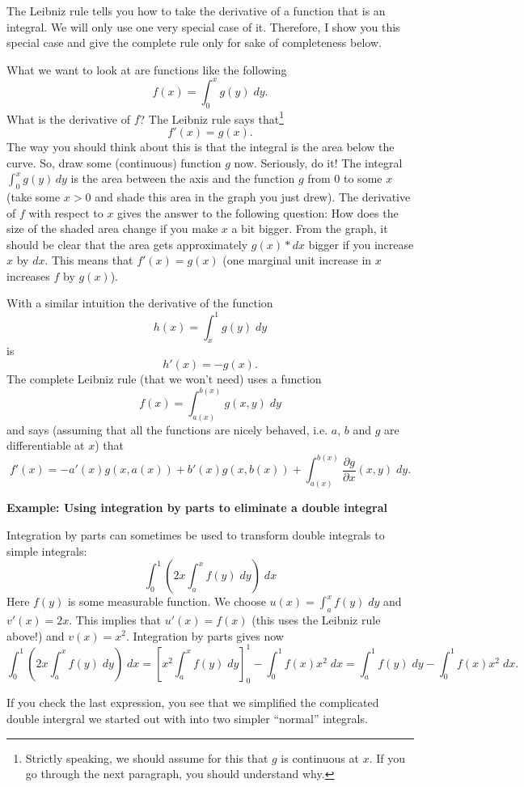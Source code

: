 \documentclass[a4paper,12pt]{article}
\begin{document}
The Leibniz rule tells you how to take the derivative of a function that is an integral. We will only use one very special case of it. Therefore, I show you this special case and give the complete rule only for sake of completeness below.

What we want to look at are functions like the following
$$f(x)=\int_0^x g(y) \;dy.$$
What is the derivative of $f$? The Leibniz rule says that\footnote{Strictly speaking, we should assume for this that $g$ is continuous at $x$. If you go through the next paragraph, you should understand why.} 
$$f'(x)=g(x).$$
The way you should think about this is that the integral is the area below the curve. So, draw some (continuous) function $g$ now. Seriously, do it! The integral $\int_0^xg(y)\, dy$ is the area between the axis and the function $g$ from $0$ to some $x$ (take some $x>0$ and shade this area in the graph you just drew). The derivative of $f$ with respect to $x$ gives the answer to the following question: How does the size of the shaded area change if you make $x$ a bit bigger. From the graph, it should be clear that the area gets approximately $g(x)*dx$ bigger if you increase $x$ by $dx$. This means that $f'(x)=g(x)$ (one marginal unit increase in $x$ increases $f$ by $g(x)$).

With a similar intuition the derivative of the function 
\begin{equation*}
  h(x)=\int_x^1g(y)\; dy
\end{equation*}
is 
\begin{equation*}
  h'(x)=-g(x).
\end{equation*}
The complete Leibniz rule (that we won't need) uses a function
\begin{equation*}
  f(x)=\int_{a(x)}^{b(x)}g(x,y)\;dy
\end{equation*}
and says (assuming that all the functions are nicely behaved, i.e. $a$, $b$ and $g$ are differentiable at $x$) that 
\begin{equation*}
  f'(x)=-a'(x) g(x,a(x))+b'(x)g(x,b(x))+\int_{a(x)}^{b(x)}\frac{\partial g}{\partial x}(x,y)\;dy.
\end{equation*}

\textbf{Example: Using integration by parts to eliminate a double integral}

Integration by parts can sometimes be used to transform double integrals to simple integrals:
\begin{equation*}
  \int_0^1\left(2x \int_a^x f(y)\;dy\right)\;dx
\end{equation*}
Here $f(y)$ is some measurable function. We choose $u(x)=\int_a^xf(y)\;dy$ and $v'(x)=2x$. This implies that $u'(x)=f(x)$ (this uses the Leibniz rule above!) and $v(x)=x^2$. Integration by parts gives now
\begin{equation*}
  \int_0^1\left(2x \int_a^x f(y)\;dy\right)\;dx= \left[x^2 \int_a^x f(y)\;dy\right]_0^1-\int_0^1f(x) x^2\;dx=\int_a^1f(y)\;dy-\int_0^1f(x)x^2\;dx.
\end{equation*}

If you check the last expression, you see that we simplified the complicated double intergral we started out with into two simpler ``normal'' integrals.
\end{document}
